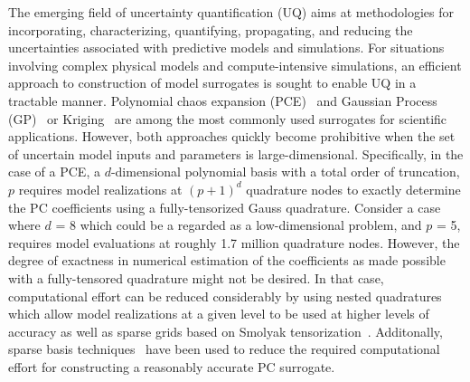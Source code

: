 The emerging field of uncertainty quantification (UQ) aims at methodologies for 
incorporating, characterizing, quantifying, propagating, and reducing the 
uncertainties associated with predictive models and simulations. For situations
involving complex physical models and compute-intensive simulations, an
efficient approach to construction of model surrogates is sought to enable UQ
in a tractable manner. Polynomial chaos expansion 
(PCE)~\cite{Xiu:2002,Ghanem:2003,Olivier:2010} and 
Gaussian Process (GP)~\cite{Rasmussen:2004} or Kriging~\cite{Stein:2012} are
among the most commonly used surrogates for scientific applications. However,
both approaches quickly become prohibitive when the set of uncertain model
inputs and parameters is large-dimensional. Specifically, in the case of a PCE,
a $d$-dimensional polynomial basis with a total order of truncation, $p$ 
requires model realizations at $(p+1)^d$ quadrature nodes to exactly determine the PC
coefficients using a fully-tensorized Gauss quadrature. Consider a case where $d$ = 8 which
could be a regarded as a low-dimensional problem, and $p$ = 5, requires model evaluations at
roughly 1.7 million quadrature nodes. However, the degree of exactness in numerical estimation 
of the coefficients as made possible with a fully-tensored quadrature might not be desired. In that
case, computational effort can be reduced considerably by using nested
quadratures~\cite{Gentleman:1972a,Gentleman:1972b,Novak:1999,Waldvogel:2006} which allow 
model realizations at a given level to be used at higher levels of accuracy as well as sparse grids
based on Smolyak tensorization~\cite{Smolyak:1963}. Additonally, sparse basis 
techniques~\cite{Peng:2014,Hampton:2015,Blatman:2011} have been used to reduce  the required
computational effort for constructing a reasonably accurate PC surrogate. 


